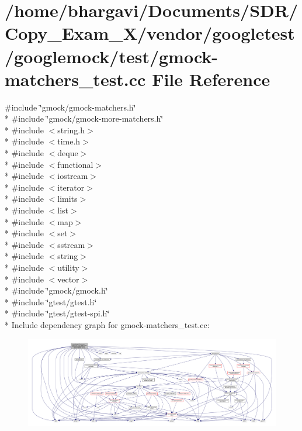 \hypertarget{gmock-matchers__test_8cc}{}\section{/home/bhargavi/\+Documents/\+S\+D\+R/\+Copy\+\_\+\+Exam\+\_\+X/vendor/googletest/googlemock/test/gmock-\/matchers\+\_\+test.cc File Reference}
\label{gmock-matchers__test_8cc}
{\ttfamily \#include \char`\"{}gmock/gmock-\/matchers.\+h\char`\"{}}\\*
{\ttfamily \#include \char`\"{}gmock/gmock-\/more-\/matchers.\+h\char`\"{}}\\*
{\ttfamily \#include $<$string.\+h$>$}\\*
{\ttfamily \#include $<$time.\+h$>$}\\*
{\ttfamily \#include $<$deque$>$}\\*
{\ttfamily \#include $<$functional$>$}\\*
{\ttfamily \#include $<$iostream$>$}\\*
{\ttfamily \#include $<$iterator$>$}\\*
{\ttfamily \#include $<$limits$>$}\\*
{\ttfamily \#include $<$list$>$}\\*
{\ttfamily \#include $<$map$>$}\\*
{\ttfamily \#include $<$set$>$}\\*
{\ttfamily \#include $<$sstream$>$}\\*
{\ttfamily \#include $<$string$>$}\\*
{\ttfamily \#include $<$utility$>$}\\*
{\ttfamily \#include $<$vector$>$}\\*
{\ttfamily \#include \char`\"{}gmock/gmock.\+h\char`\"{}}\\*
{\ttfamily \#include \char`\"{}gtest/gtest.\+h\char`\"{}}\\*
{\ttfamily \#include \char`\"{}gtest/gtest-\/spi.\+h\char`\"{}}\\*
Include dependency graph for gmock-\/matchers\+\_\+test.cc\+:
\nopagebreak
\begin{figure}[H]
\begin{center}
\leavevmode
\includegraphics[width=350pt]{gmock-matchers__test_8cc__incl}
\end{center}
\end{figure}
